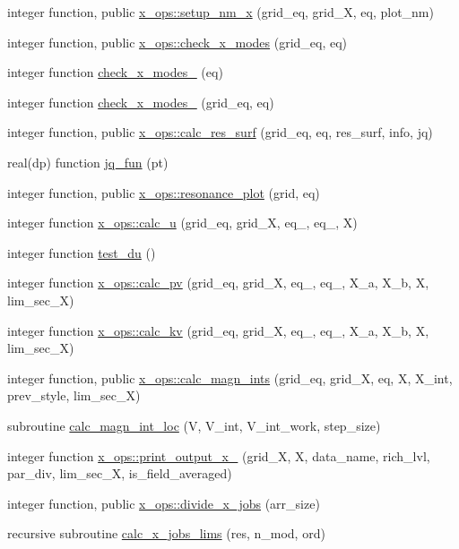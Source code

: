 \begin{DoxyCompactItemize}
\item 
integer function, public \hyperlink{namespacex__ops_ad0f44ec07a3b246da23f9aa659683bdf}{x\+\_\+ops\+::setup\+\_\+nm\+\_\+x} (grid\+\_\+eq, grid\+\_\+X, eq, plot\+\_\+nm)
\item 
integer function, public \hyperlink{namespacex__ops_a7d9275e2d927d92548416f21b983b604}{x\+\_\+ops\+::check\+\_\+x\+\_\+modes} (grid\+\_\+eq, eq)
\item 
integer function \hyperlink{X__ops_8f90_a02770f90fcd38f73e7b6c7f267f17708}{check\+\_\+x\+\_\+modes\+\_} (eq)
\item 
integer function \hyperlink{X__ops_8f90_a9fba21ce7e69eeb679c06ac453ed41ce}{check\+\_\+x\+\_\+modes\+\_} (grid\+\_\+eq, eq)
\item 
integer function, public \hyperlink{namespacex__ops_a25de9da6a17d73109146d0f92bdf11f3}{x\+\_\+ops\+::calc\+\_\+res\+\_\+surf} (grid\+\_\+eq, eq, res\+\_\+surf, info, jq)
\item 
real(dp) function \hyperlink{X__ops_8f90_afba7acbd6df586741b0375f1d699574f}{jq\+\_\+fun} (pt)
\item 
integer function, public \hyperlink{namespacex__ops_a766228ae0a64f84c10521a013367cfc8}{x\+\_\+ops\+::resonance\+\_\+plot} (grid, eq)
\item 
integer function \hyperlink{namespacex__ops_a4e39701da15ff952add5133db1897b52}{x\+\_\+ops\+::calc\+\_\+u} (grid\+\_\+eq, grid\+\_\+X, eq\+\_, eq\+\_, X)
\item 
integer function \hyperlink{X__ops_8f90_a60ad682c469a085ff3f744ce3191940f}{test\+\_\+du} ()
\item 
integer function \hyperlink{namespacex__ops_a51f3bf0b4c8d688ffbcc3a1adbca9762}{x\+\_\+ops\+::calc\+\_\+pv} (grid\+\_\+eq, grid\+\_\+X, eq\+\_, eq\+\_, X\+\_\+a, X\+\_\+b, X, lim\+\_\+sec\+\_\+X)
\item 
integer function \hyperlink{namespacex__ops_a045e8903230dfa0fb8b89b458d0c8ee2}{x\+\_\+ops\+::calc\+\_\+kv} (grid\+\_\+eq, grid\+\_\+X, eq\+\_, eq\+\_, X\+\_\+a, X\+\_\+b, X, lim\+\_\+sec\+\_\+X)
\item 
integer function, public \hyperlink{namespacex__ops_a6df79622d1b95d54ab3e542751a5881d}{x\+\_\+ops\+::calc\+\_\+magn\+\_\+ints} (grid\+\_\+eq, grid\+\_\+X, eq, X, X\+\_\+int, prev\+\_\+style, lim\+\_\+sec\+\_\+X)
\item 
subroutine \hyperlink{X__ops_8f90_a319069f9962e6d8964d1186afcea89e4}{calc\+\_\+magn\+\_\+int\+\_\+loc} (V, V\+\_\+int, V\+\_\+int\+\_\+work, step\+\_\+size)
\item 
integer function \hyperlink{namespacex__ops_a28615c2a15bf15a2d2acd71038386135}{x\+\_\+ops\+::print\+\_\+output\+\_\+x\+\_} (grid\+\_\+X, X, data\+\_\+name, rich\+\_\+lvl, par\+\_\+div, lim\+\_\+sec\+\_\+X, is\+\_\+field\+\_\+averaged)
\item 
integer function, public \hyperlink{namespacex__ops_a677c88d85fe1bfbf3579a2421ce16f2f}{x\+\_\+ops\+::divide\+\_\+x\+\_\+jobs} (arr\+\_\+size)
\item 
recursive subroutine \hyperlink{X__ops_8f90_a58e5d0ffc9b2330a15d917aa8766a42a}{calc\+\_\+x\+\_\+jobs\+\_\+lims} (res, n\+\_\+mod, ord)
\end{DoxyCompactItemize}
